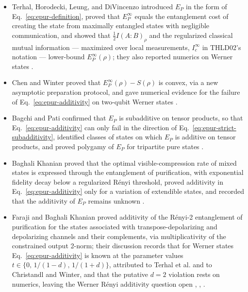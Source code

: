 \begin{itemize}
  \item Terhal, Horodecki, Leung, and DiVincenzo introduced $E_P$ in the form of
Eq.~\eqref{eq:epur-definition}, proved that $E_P^\infty$ equals the
entanglement cost of creating the state from maximally entangled states with
negligible communication, and showed that $\frac12I(A{:}B)_\rho$ and the
regularized classical mutual information --- maximized over local
measurements, $I_c^\infty$ in THLD02's notation --- lower-bound
$E_P^\infty(\rho)$; they also reported numerics on Werner states
.

  \item Chen and Winter proved that $E_P^\infty(\rho)-S(\rho)$ is convex, via a new
asymptotic preparation protocol, and gave numerical evidence for the failure of
Eq.~\eqref{eq:epur-additivity} on two-qubit Werner states
.

  \item Bagchi and Pati confirmed that $E_P$ is subadditive on tensor products, so
that Eq.~\eqref{eq:epur-additivity} can only fail in the direction of
Eq.~\eqref{eq:epur-strict-subadditivity}, identified classes of states on
which $E_P$ is additive on tensor products, and proved polygamy of $E_P$ for
tripartite pure states .

  \item Baghali Khanian proved that the optimal visible-compression rate of mixed
states is expressed through the entanglement of purification, with
exponential fidelity decay below a regularized R\'enyi threshold, proved
additivity in Eq.~\eqref{eq:epur-additivity} only for a variation of
extendible states, and recorded that the additivity of $E_P$ remains unknown
.

  \item Faraji and Baghali Khanian proved additivity of the R\'enyi-2 entanglement of
purification for the states associated with transpose-depolarizing and
depolarizing channels and their complements, via multiplicativity of the
constrained output 2-norm; their discussion records that for Werner states
Eq.~\eqref{eq:epur-additivity} is known at the parameter values
$t\in\{0,\,1/(1-d),\,1/(1+d)\}$, attributed to Terhal et al. and to
Christandl and Winter, and that the putative $d=2$ violation rests on
numerics, leaving the Werner R\'enyi additivity question open
,
,
.


\end{itemize}
